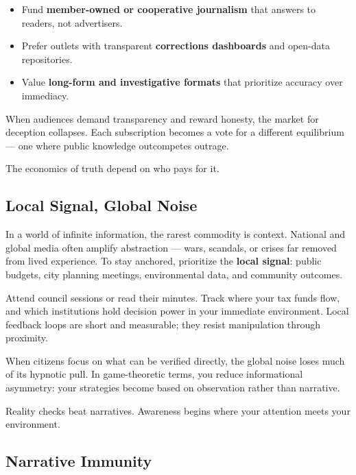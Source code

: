 \documentclass[12pt,twoside]{book}
\begin{document}
\begin{itemize}
  \item Fund \textbf{member-owned or cooperative journalism} that answers to readers, not advertisers.  
  \item Prefer outlets with transparent \textbf{corrections dashboards} and open-data repositories.  
  \item Value \textbf{long-form and investigative formats} that prioritize accuracy over immediacy.  
\end{itemize}

When audiences demand transparency and reward honesty, the market for deception collapses.  
Each subscription becomes a vote for a different equilibrium --- one where public knowledge outcompetes outrage.\\

\begin{keyidea}
The economics of truth depend on who pays for it.
\end{keyidea}

\subsection*{Local Signal, Global Noise}

In a world of infinite information, the rarest commodity is context.  
National and global media often amplify abstraction --- wars, scandals, or crises far removed from lived experience.  
To stay anchored, prioritize the \textbf{local signal}: public budgets, city planning meetings, environmental data, and community outcomes.  

Attend council sessions or read their minutes.  
Track where your tax funds flow, and which institutions hold decision power in your immediate environment.  
Local feedback loops are short and measurable; they resist manipulation through proximity.  

When citizens focus on what can be verified directly, the global noise loses much of its hypnotic pull.  
In game-theoretic terms, you reduce informational asymmetry: your strategies become based on observation rather than narrative.\\

\begin{keyidea}
Reality checks beat narratives.  
Awareness begins where your attention meets your environment.
\end{keyidea}

\subsection*{Narrative Immunity}
\end{document}
